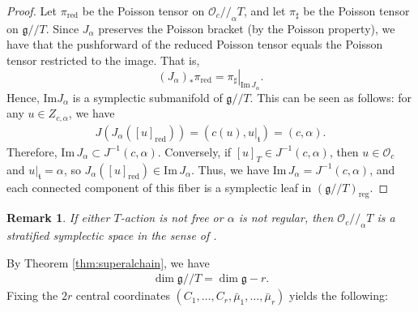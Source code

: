 \documentclass[11pt,reqno]{amsart}
\newtheorem*{theorem A}{Main Theorem A}
\newtheorem*{theorem B}{Main Theorem B}
\newtheorem*{theorem C}{Main Theorem C}
\newtheorem*{theorem D}{Main Theorem D}
\theoremstyle{definition}
\theoremstyle{plain}
\newtheorem{remark}[theorem]{Remark}
\theoremstyle{conclusion}
\begin{document}
\begin{proof}
Let $\pi_{\mathrm{red}}$ be the Poisson tensor on $\mathcal{O}_c//_\alpha T$, and let $\pi_\sharp$ be the Poisson tensor on $\mathfrak{g}//T$. Since $J_\alpha$ preserves the Poisson bracket (by the Poisson property), we have that the pushforward of the reduced Poisson tensor equals the Poisson tensor restricted to the image. That is, $${(J_\alpha)}_* \pi_{\mathrm{red}} = \left.\pi_{\sharp} \right\vert_{\mathrm{Im} \, J_\alpha}.$$ Hence, $\mathrm{Im}J_\alpha$ is a symplectic submanifold of $\mathfrak{g} //T$. This can be seen as follows: %
for any $u \in Z_{c,\alpha}$, we have \begin{align*}
    J(J_\alpha([u]_{\mathrm{red}})) = (c(u),u\vert_\mathfrak{t}) = (c,\alpha).
\end{align*} Therefore, $\mathrm{Im} \, J_\alpha \subset J^{-1}(c,\alpha)$. Conversely, if $[u]_T \in J^{-1}(c,\alpha)$, then $u \in \mathcal{O}_c$ and $u\vert_\mathfrak{t} = \alpha$, so $J_\alpha([u]_{\mathrm{red}}) \in \mathrm{Im} \, J_\alpha$. Thus, we have $\mathrm{Im} \, J_\alpha  = J^{-1}(c,\alpha)$, and each connected component of this fiber is a symplectic leaf in $\left(\mathfrak{g}//T\right)_{\mathrm{reg}}$.
\end{proof}
\begin{remark}
    If either $T$-action is not free or $\alpha$ is not regular, then $\mathcal{O}_c//_\alpha T$ is a stratified symplectic space in the sense of \cite{sjamaar1991stratified}.
\end{remark}
 
By Theorem \ref{thm:superalchain}, we have \begin{align*}
\dim \mathfrak{g}//T =\dim\mathfrak{g} - r.
\end{align*} Fixing the $2r$ central coordinates  $(C_1,\dots,C_r,\bar{\mu}_1,\dots,\bar{\mu}_r)$ yields the following:
\end{document}
